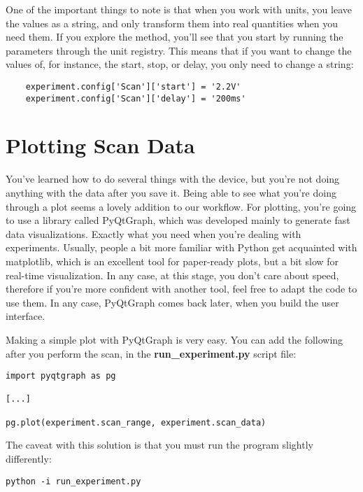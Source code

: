 One of the important things to note is that when you work with units, you leave the values as a string, and only transform them into real quantities when you need them. If you explore the  method, you'll see that you start by running the parameters through the unit registry. This means that if you want to change the values of, for instance, the start, stop, or delay, you only need to change a string:

\begin{verbatim}
    experiment.config['Scan']['start'] = '2.2V'
    experiment.config['Scan']['delay'] = '200ms'
\end{verbatim}

\section{Plotting Scan Data}\label{sec:basic-plotting}
You've learned how to do several things with the device, but you're not doing anything with the data after you save it. Being able to see what you're doing through a plot seems a lovely addition to our workflow. For plotting, you're going to use a library called PyQtGraph, which was developed mainly to generate fast data visualizations. Exactly what you need when you're dealing with experiments. Usually, people a bit more familiar with Python get acquainted with matplotlib, which is an excellent tool for paper-ready plots, but a bit slow for real-time visualization. In any case, at this stage, you don't care about speed, therefore if you're more confident with another tool, feel free to adapt the code to use them. In any case, PyQtGraph comes back later, when you build the user interface.

Making a simple plot with PyQtGraph is very easy. You can add the following after you perform the scan, in the \textbf{run\_experiment.py} script file:

\begin{verbatim}
import pyqtgraph as pg

[...]

pg.plot(experiment.scan_range, experiment.scan_data)
\end{verbatim}

The caveat with this solution is that you must run the program slightly differently:

\begin{verbatim}
python -i run_experiment.py
\end{verbatim}

